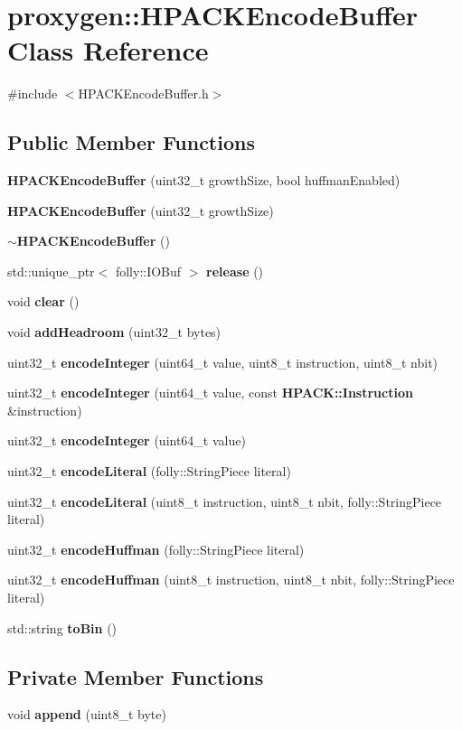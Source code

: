 \section{proxygen\+:\+:H\+P\+A\+C\+K\+Encode\+Buffer Class Reference}
\label{classproxygen_1_1HPACKEncodeBuffer}


{\ttfamily \#include $<$H\+P\+A\+C\+K\+Encode\+Buffer.\+h$>$}

\subsection*{Public Member Functions}
\begin{DoxyCompactItemize}
\item 
{\bf H\+P\+A\+C\+K\+Encode\+Buffer} (uint32\+\_\+t growth\+Size, bool huffman\+Enabled)
\item 
{\bf H\+P\+A\+C\+K\+Encode\+Buffer} (uint32\+\_\+t growth\+Size)
\item 
{\bf $\sim$\+H\+P\+A\+C\+K\+Encode\+Buffer} ()
\item 
std\+::unique\+\_\+ptr$<$ folly\+::\+I\+O\+Buf $>$ {\bf release} ()
\item 
void {\bf clear} ()
\item 
void {\bf add\+Headroom} (uint32\+\_\+t bytes)
\item 
uint32\+\_\+t {\bf encode\+Integer} (uint64\+\_\+t value, uint8\+\_\+t instruction, uint8\+\_\+t nbit)
\item 
uint32\+\_\+t {\bf encode\+Integer} (uint64\+\_\+t value, const {\bf H\+P\+A\+C\+K\+::\+Instruction} \&instruction)
\item 
uint32\+\_\+t {\bf encode\+Integer} (uint64\+\_\+t value)
\item 
uint32\+\_\+t {\bf encode\+Literal} (folly\+::\+String\+Piece literal)
\item 
uint32\+\_\+t {\bf encode\+Literal} (uint8\+\_\+t instruction, uint8\+\_\+t nbit, folly\+::\+String\+Piece literal)
\item 
uint32\+\_\+t {\bf encode\+Huffman} (folly\+::\+String\+Piece literal)
\item 
uint32\+\_\+t {\bf encode\+Huffman} (uint8\+\_\+t instruction, uint8\+\_\+t nbit, folly\+::\+String\+Piece literal)
\item 
std\+::string {\bf to\+Bin} ()
\end{DoxyCompactItemize}
\subsection*{Private Member Functions}
\begin{DoxyCompactItemize}
\item 
void {\bf append} (uint8\+\_\+t byte)
\end{DoxyCompactItemize}
